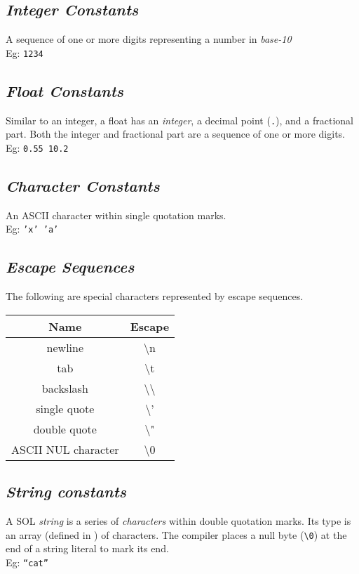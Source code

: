 \documentclass[letterpaper,12pt]{article}
\begin{document}
    \subsection{\textit{Integer Constants}}
    A sequence of one or more digits representing a number in \textit{base-10}\\
    Eg: \texttt{1234}

    \subsection{\textit{Float Constants}}
    Similar to an integer, a float has an \textit{integer}, a decimal point (\texttt{.}), and a fractional part. Both the integer and fractional part are a sequence of one or more digits.\\
    Eg: \texttt{0.55  10.2}

    \subsection{\textit{Character Constants}}
    An ASCII character within single quotation marks.\\
    Eg: \texttt{'x' 'a'}

    \subsection{\textit{Escape Sequences}}
    The following are special characters represented by escape sequences.
        \begin{center}
            \begin{tabular}{ |c|c| }
            \hline
                \textbf{Name}   & \textbf{Escape}\\
                \hline
                newline         & \textbackslash n\\
                tab             & \textbackslash t\\
                backslash       & \textbackslash \textbackslash\\
                single quote    & \textbackslash '\\
                double quote    & \textbackslash "\\
                ASCII NUL character & \textbackslash 0\\
            \hline
            \end{tabular}
        \end{center}

    \subsection{\textit{String constants}}
    A SOL \textit{string} is a series of \textit{characters} within double quotation marks. Its type is an array (defined in ) of characters. The compiler places a null byte (\texttt{\textbackslash0}) at the end of a string literal to mark its end.\\
    Eg: \texttt{“cat”}
\end{document}
